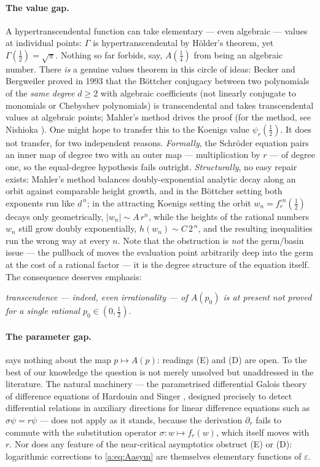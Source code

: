 \paragraph{The value gap.}
A hypertranscendental function can take elementary --- even algebraic --- values at individual points: $\Gamma$ is hypertranscendental by H\"older's theorem, yet $\Gamma(\tfrac12)=\sqrt{\pi}$. Nothing so far forbids, say, $A(\tfrac14)$ from being an algebraic number. There \emph{is} a genuine values theorem in this circle of ideas: Becker and Bergweiler proved in 1993 \cite{Becker1993} that the B\"ottcher conjugacy between two polynomials of the \emph{same degree} $d\ge2$ with algebraic coefficients (not linearly conjugate to monomials or Chebyshev polynomials) is transcendental and takes transcendental values at algebraic points; Mahler's method drives the proof (for the method, see Nishioka \cite{Nishioka1996}). One might hope to transfer this to the Koenigs value $\psi_r(\tfrac12)$. It does not transfer, for two independent reasons. \emph{Formally}, the Schr\"oder equation pairs an inner map of degree two with an outer map --- multiplication by $r$ --- of degree one, so the equal-degree hypothesis fails outright. \emph{Structurally}, no easy repair exists: Mahler's method balances doubly-exponential analytic decay along an orbit against comparable height growth, and in the B\"ottcher setting both exponents run like $d^{\,n}$; in the attracting Koenigs setting the orbit $w_n=f_r^{\circ n}(\tfrac12)$ decays only geometrically, $|w_n|\sim A\,r^{n}$, while the heights of the rational numbers $w_n$ still grow doubly exponentially, $h(w_n)\sim C\,2^{\,n}$, and the resulting inequalities run the wrong way at every $n$. Note that the obstruction is \emph{not} the germ/basin issue --- the pullback of  moves the evaluation point arbitrarily deep into the germ at the cost of a rational factor --- it is the degree structure of the equation itself. The consequence deserves emphasis:
\begin{center}
\emph{transcendence --- indeed, even irrationality --- of $A(p_0)$ is at present not proved\\ for a single rational $p_0\in(0,\tfrac12)$.}
\end{center}

\paragraph{The parameter gap.}
 says nothing about the map $p\mapsto A(p)$: readings (E) and (D) are open. To the best of our knowledge the question is not merely unsolved but unaddressed in the literature. The natural machinery --- the parametrised differential Galois theory of difference equations of Hardouin and Singer \cite{HardouinSinger2008}, designed precisely to detect differential relations in auxiliary directions for linear difference equations such as $\sigma\psi=r\psi$ --- does not apply as it stands, because the derivation $\partial_r$ fails to commute with the substitution operator $\sigma\colon w\mapsto f_r(w)$, which itself moves with $r$. Nor does any feature of the near-critical asymptotics obstruct (E) or (D): logarithmic corrections to \eqref{a:eq:Aasym} are themselves elementary functions of $\varepsilon$.

